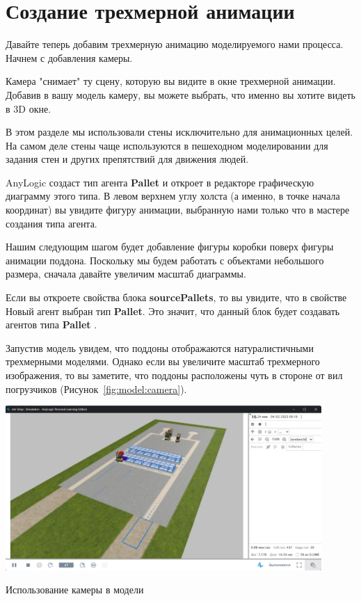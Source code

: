 \section{Создание трехмерной анимации}
Давайте теперь добавим трехмерную анимацию моделируемого нами процесса.
Начнем с добавления камеры.\par
Камера "снимает" ту сцену, которую вы видите в окне трехмерной анимации.
Добавив в вашу модель камеру, вы можете выбрать, что именно вы хотите
видеть в 3D окне.\par
В этом разделе мы использовали стены исключительно для анимационных
целей. На самом деле стены чаще используются в пешеходном
моделировании для задания стен и других препятствий для движения
людей.\par
AnyLogic создаст тип агента \textbf{Pallet} и откроет в редакторе графическую
диаграмму этого типа. В левом верхнем углу холста (а именно, в точке
начала координат) вы увидите фигуру анимации, выбранную нами только что
в мастере создания типа агента.\par
Нашим следующим шагом будет добавление фигуры коробки поверх фигуры
анимации поддона. Поскольку мы будем работать с объектами небольшого
размера, сначала давайте увеличим масштаб диаграммы.\par
Если вы откроете свойства блока \textbf{sourcePallets}, то вы увидите,
что в свойстве Новый агент выбран тип \textbf{Pallet}. Это значит,
что данный блок будет создавать агентов типа \textbf{Pallet} .\par
Запустив модель увидем, что поддоны отображаются натуралистичными трехмерными
моделями. Однако если вы увеличите масштаб трехмерного изображения, то вы
заметите, что поддоны расположены чуть в стороне от вил погрузчиков
(Рисунок~\ref{fig:model:camera}).

\begin{image}
	\includegraphics[width=0.9\textwidth]{2023-04-02_15-11-00}
	\caption{Использование камеры в модели}
	\label{fig:model:camera}
\end{image}

